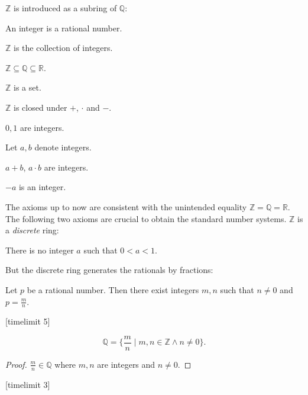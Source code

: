 \documentclass{article}
\begin{document}
$\mathbb{Z}$ is introduced as a subring of $\mathbb{Q}$:

\begin{forthel}

\begin{signature}
An integer is a rational number.
\end{signature}

\begin{definition}
$\mathbb{Z}$ is the collection of integers.
\end{definition}

\begin{lemma}
$\mathbb{Z} \subseteq \mathbb{Q} \subseteq \mathbb{R}$.
\end{lemma}

\begin{lemma}
$\mathbb{Z}$ is a set.
\end{lemma}
\end{forthel}
%
$\mathbb{Z}$ is closed under $+$, $\cdot$ and $-$.
%
\begin{forthel}
\begin{axiom}
$0,1$ are integers.
\end{axiom}

Let $a,b$ denote integers.

\begin{axiom}
$a + b$, $a \cdot b$ are integers.
\end{axiom}

\begin{axiom}
$-a$ is an integer.
\end{axiom}
\end{forthel}
%
The axioms up to now are consistent with the unintended
equality $\mathbb{Z} = \mathbb{Q} = \mathbb{R}$. The following
two axioms are crucial to obtain the standard number systems.
$\mathbb{Z}$ is a {\em discrete} ring:
%
\begin{forthel}
\begin{axiom}
There is no integer $a$ such that $0 < a < 1$.
\end{axiom}
\end{forthel}
%
But the discrete ring generates the rationals by fractions:
%
\begin{forthel}
\begin{axiom} Let $p$ be a rational number. Then
there exist integers $m, n$ such that
$n \neq 0$ and $p = \frac{m}{n}$.
\end{axiom}
[timelimit 5]
\begin{lemma}
$$\mathbb{Q} =
\{\frac{m}{n} \mid m,n \in \mathbb{Z} \wedge n \neq 0\}.$$
\end{lemma}
\begin{proof}
$\frac{m}{n} \in \mathbb{Q}$ where $m,n$ are integers and
$n \neq 0$.
\end{proof}
[timelimit 3]
\end{forthel}
\end{document}
